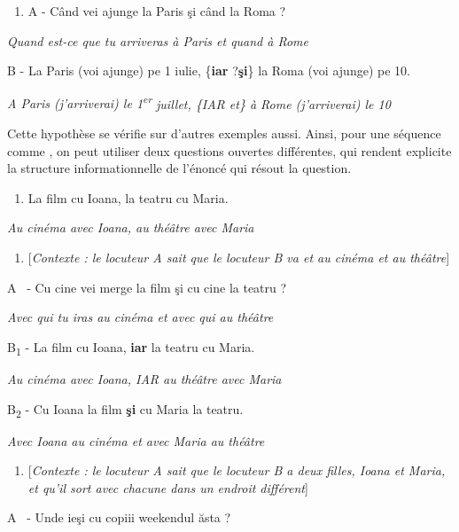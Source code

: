 \begin{enumerate}
\item \label{bkm:Ref301969814}A  - Când vei ajunge la Paris şi când la Roma ?


\end{enumerate}
{\itshape
Quand est-ce que tu arriveras à Paris et quand à Rome}

  B  - La Paris (voi ajunge) pe 1 iulie, \{\textbf{iar {\textbar}} ?\textbf{şi}\} la Roma (voi ajunge) pe 10.

\textit{A Paris (j'arriverai) le 1}\textit{\textsuperscript{er}}\textit{ juillet, \{IAR {\textbar} et\} à Rome (j'arriverai) le 10} 

Cette hypothèse se vérifie sur d'autres exemples aussi. Ainsi, pour une séquence comme , on peut utiliser deux questions ouvertes différentes, qui rendent explicite la structure informationnelle de l'énoncé qui résout la question. 


\begin{enumerate}
\item \label{bkm:Ref301970680}La film cu Ioana, la teatru cu Maria. 


\end{enumerate}
{\itshape
  Au cinéma avec Ioana, au théâtre avec Maria}


\begin{enumerate}
\item \label{bkm:Ref301971540}[\textit{Contexte : le locuteur A sait que le locuteur B va et au cinéma et au théâtre}]


\end{enumerate}
  A~  - Cu cine vei merge la film şi cu cine la teatru ?

{\itshape
Avec qui tu iras au cinéma et avec qui au théâtre}

  B\textsubscript{1}  - La film cu Ioana, \textbf{iar} la teatru cu Maria.

{\itshape
Au cinéma avec Ioana, IAR au théâtre avec Maria}

  B\textsubscript{2}  - Cu Ioana la film \textbf{şi} cu Maria la teatru.

{\itshape
Avec Ioana au cinéma et avec Maria au théâtre} 


\begin{enumerate}
\item \label{bkm:Ref301971542}[\textit{Contexte : le locuteur A sait que le locuteur B a deux filles, Ioana et Maria, et qu'il sort avec chacune dans un endroit différent}]


\end{enumerate}
  A~  - Unde ieşi cu copiii weekendul ăsta ?

